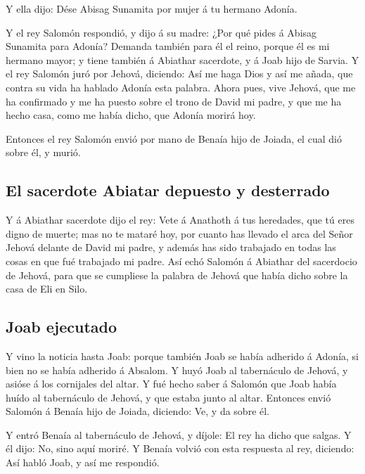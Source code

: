  Y ella dijo: Dése Abisag Sunamita por mujer á tu hermano
Adonía.

 Y el rey Salomón respondió, y dijo á su madre: ¿Por qué
pides á Abisag Sunamita para Adonía? Demanda también para él el reino,
porque él es mi hermano mayor; y tiene también á Abiathar sacerdote, y á
Joab hijo de Sarvia.  Y el rey Salomón juró por Jehová,
diciendo: Así me haga Dios y así me añada, que contra su vida ha hablado
Adonía esta palabra.  Ahora pues, vive Jehová, que me ha
confirmado y me ha puesto sobre el trono de David mi padre, y que me ha
hecho casa, como me había dicho, que Adonía morirá hoy.

 Entonces el rey Salomón envió por mano de Benaía hijo de
Joiada, el cual dió sobre él, y murió.

\hypertarget{el-sacerdote-abiatar-depuesto-y-desterrado}{%
\subsection{El sacerdote Abiatar depuesto y
desterrado}\label{el-sacerdote-abiatar-depuesto-y-desterrado}}

 Y á Abiathar sacerdote dijo el rey: Vete á Anathoth á tus
heredades, que tú eres digno de muerte; mas no te mataré hoy, por cuanto
has llevado el arca del Señor Jehová delante de David mi padre, y además
has sido trabajado en todas las cosas en que fué trabajado mi padre.
 Así echó Salomón á Abiathar del sacerdocio de Jehová, para
que se cumpliese la palabra de Jehová que había dicho sobre la casa de
Eli en Silo.

\hypertarget{joab-ejecutado}{%
\subsection{Joab ejecutado}\label{joab-ejecutado}}

 Y vino la noticia hasta Joab: porque también Joab se había
adherido á Adonía, si bien no se había adherido á Absalom. Y huyó Joab
al tabernáculo de Jehová, y asióse á los cornijales del altar.
 Y fué hecho saber á Salomón que Joab había huído al
tabernáculo de Jehová, y que estaba junto al altar. Entonces envió
Salomón á Benaía hijo de Joiada, diciendo: Ve, y da sobre él.

 Y entró Benaía al tabernáculo de Jehová, y díjole: El rey
ha dicho que salgas. Y él dijo: No, sino aquí moriré. Y Benaía volvió
con esta respuesta al rey, diciendo: Así habló Joab, y así me respondió.


